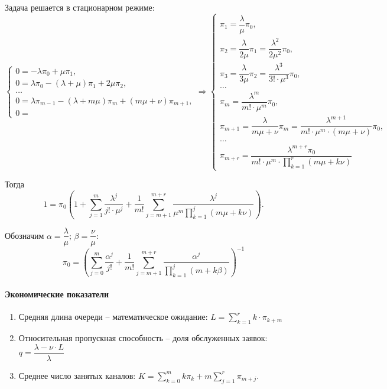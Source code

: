 Задача решается в стационарном режиме:
\[
  \begin{cases}
    0 = -\lambda \pi_0 + \mu \pi_1, \\
    0 = \lambda \pi_0 - (\lambda+\mu) \pi_1 + 2\mu\pi_2, \\
    \dots \\
    0 = \lambda \pi_{m-1} - (\lambda+m\mu) \pi_m + (m\mu+\nu) \pi_{m+1}, \\
    0 = 
  \end{cases}
  \Rightarrow
  \begin{cases}
    \pi_1 = \dfrac{\lambda}{\mu} \pi_0, \\
    \pi_2 = \dfrac{\lambda}{2\mu}\pi_1 = \dfrac{\lambda^2}{2\mu^2} \pi_0,\\
    \pi_3 = \dfrac{\lambda}{3\mu} \pi_2 = \dfrac{\lambda^3}{3! \cdot \mu^3} \pi_0, \\
    \dots \\
    \pi_m = \dfrac{\lambda^m}{m! \cdot \mu^m} \pi_0, \\
    \pi_{m+1} = \dfrac{\lambda}{m\mu + \nu} \pi_m = \dfrac{\lambda^{m+1}}{m! \cdot \mu^m \cdot (m\mu+\nu)} \pi_0, \\
    \dots\\
    \pi_{m+r} = \dfrac{\lambda^{m+r} \pi_0}{m! \cdot \mu^m \cdot \prod_{k=1}^r (m\mu+k\nu)}
  \end{cases}
\]

Тогда
\[
1 = \pi_0 \left( 1
  + \sum_{j=1}^m \dfrac{\lambda^j}{j! \cdot \mu^j}
+ \dfrac{1}{m!} \sum_{j=m+1}^{m+r} \dfrac{\lambda^j}{\mu^m \prod_{k=1}^j (m\mu + k\nu)} \right).
\]

Обозначим $\alpha = \dfrac{\lambda}{\mu}; \, \beta = \dfrac{\nu}{\mu}$:
\[
  \pi_0 = \left( \sum_{j=0}^m \dfrac{\alpha^j}{j!}
  + \dfrac{1}{m!} \sum_{j=m+1}^{m+r} \dfrac{\alpha^j}{\prod_{k=1}^j (m+k\beta)} \right)^{-1}
\]

\paragraph{Экономические показатели}
\begin{enumerate}
  \item Средняя длина очереди -- математическое ожидание:
    $L = \sum_{k=1}^r k \cdot \pi_{k+m}$

  \item Относительная пропускная способность -- доля обслуженных заявок:
    $q = \dfrac{\lambda - \nu\cdot L}{\lambda}$

  \item Среднее число занятых каналов:
    $K = \sum_{k=0}^m k \pi_k + m \sum_{j=1}^r \pi_{m+j}$.
\end{enumerate}

